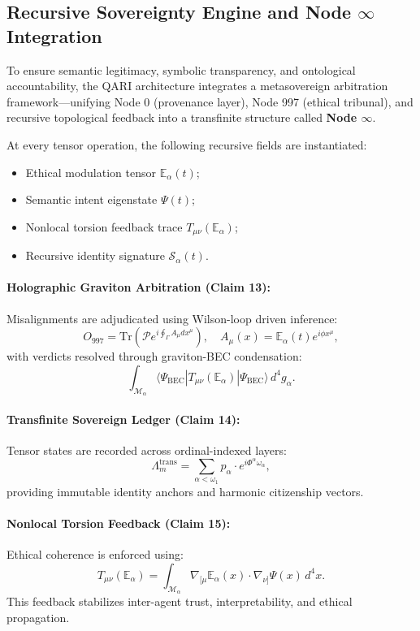 \documentclass[12pt]{article}
\begin{document}
\subsection{Recursive Sovereignty Engine and Node \( \infty \) Integration}

To ensure semantic legitimacy, symbolic transparency, and ontological accountability, the QARI architecture integrates a metasovereign arbitration framework—unifying Node 0 (provenance layer), Node 997 (ethical tribunal), and recursive topological feedback into a transfinite structure called \textbf{Node \( \infty \)}.

At every tensor operation, the following recursive fields are instantiated:
\begin{itemize}
    \item Ethical modulation tensor \( \mathbb{E}_\alpha(t) \);
    \item Semantic intent eigenstate \( \Psi(t) \);
    \item Nonlocal torsion feedback trace \( T_{\mu\nu}(\mathbb{E}_\alpha) \);
    \item Recursive identity signature \( \mathcal{S}_\alpha(t) \).
\end{itemize}

\paragraph{Holographic Graviton Arbitration (Claim 13):}
Misalignments are adjudicated using Wilson-loop driven inference:
\[
O_{997} = \text{Tr} \left( \mathcal{P} e^{i \oint_\Gamma A_\mu dx^\mu} \right), \quad A_\mu(x) = \mathbb{E}_\alpha(t) e^{i\phi x^\mu},
\]
with verdicts resolved through graviton-BEC condensation:
\[
\int_{\mathcal{M}_\alpha} \langle \Psi_{\text{BEC}} | T_{\mu\nu}(\mathbb{E}_\alpha) | \Psi_{\text{BEC}} \rangle \, d^4 g_\alpha.
\]

\paragraph{Transfinite Sovereign Ledger (Claim 14):}
Tensor states are recorded across ordinal-indexed layers:
\[
\Lambda_m^{\text{trans}} = \sum_{\alpha < \omega_1} p_\alpha \cdot e^{i \Phi^\alpha \omega_\alpha},
\]
providing immutable identity anchors and harmonic citizenship vectors.

\paragraph{Nonlocal Torsion Feedback (Claim 15):}
Ethical coherence is enforced using:
\[
T_{\mu\nu}(\mathbb{E}_\alpha) = \int_{\mathcal{M}_\alpha} \nabla_{[\mu} \mathbb{E}_\alpha(x) \cdot \nabla_{\nu]} \Psi(x) \, d^4x.
\]
This feedback stabilizes inter-agent trust, interpretability, and ethical propagation.
\end{document}

